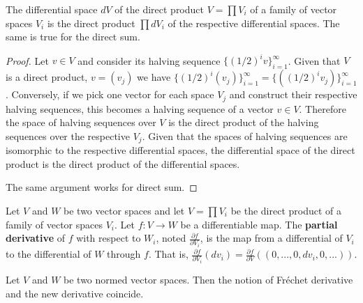 \documentclass[11pt,letterpaper,fleqn]{memoir}
\begin{document}
\begin{prop}
	The differential space $dV$ of the direct product $V=\prod V_i$ of a family of vector spaces $V_i$ is the direct product $\prod dV_i$ of the respective differential spaces. The same is true for the direct sum.
\end{prop}

\begin{proof}
	Let $v \in V$ and consider its halving sequence $\{(1/2)^i v\}_{i=1}^{\infty}$. Given that $V$ is a direct product, $v=(v_j)$ we have $\{(1/2)^i (v_j)\}_{i=1}^{\infty} = \{((1/2)^i v_j)\}_{i=1}^{\infty}$. Conversely, if we pick one vector for each space $V_j$ and construct their respective halving sequences, this becomes a halving sequence of a vector $v \in V$. Therefore the space of halving sequences over $V$ is the direct product of the halving sequences over the respective $V_j$. Given that the spaces of halving sequences are isomorphic to the respective differential spaces, the differential space of the direct product is the direct product of the differential spaces.
	
	The same argument works for direct sum.
\end{proof}

\begin{defn}
	Let $V$ and $W$ be two vector spaces and let $V=\prod V_i$ be the direct product of a family of vector spaces $V_i$. Let $f: V \to W$ be a differentiable map. The \textbf{partial derivative} of $f$ with respect to $W_i$, noted $\frac{\partial f}{\partial V_i}$, is the map from a differential of $V_i$ to the differential of $W$ through $f$. That is, $\frac{\partial f}{\partial V_i} (dv_i) = \frac{\partial f}{\partial V} \left( (0, ..., 0, dv_i, 0, ...) \right)$.
\end{defn}

\begin{conj}
	Let $V$ and $W$ be two normed vector spaces. Then the notion of Fr\'{e}chet derivative and the new derivative coincide.
\end{conj}
\end{document}
